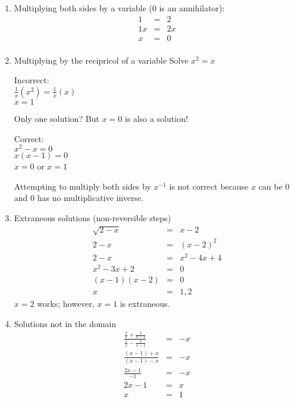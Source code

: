 \documentclass[letterpaper,12pt,fleqn]{article}
\begin{document}
\begin{enumerate}
\item Multiplying both sides by a variable (0 is an annihilator):
  \begin{eqnarray*}
    1 &=& 2 \\
    1x &=& 2x \\
    x &=& 0 \\
  \end{eqnarray*}
  
\item Multiplying by the recipricol of a variable
  Solve $x^2=x$

  Incorrect:\\
  $\frac{1}{x}(x^2)=\frac{1}{x}(x)$ \\
  $x=1$

  Only one solution? But $x=0$ is also a solution!

  Correct: \\
  $x^2-x=0$ \\
  $x(x-1)=0$ \\
  $x=0$ or $x=1$

  Attempting to multiply both sides by $x^{-1}$ is not correct because $x$
  can be $0$ and $0$ has no multiplicative inverse.

\item Extraneous solutions (non-reversible steps)
  \begin{eqnarray*}
    \sqrt{2-x} &=& x-2 \\
    2-x &=& (x-2)^2 \\
    2-x &=& x^2-4x+4 \\
    x^2-3x+2 &=& 0 \\
    (x-1)(x-2) &=& 0 \\
    x &=& 1,2
  \end{eqnarray*}
  $x=2$ works; however, $x=1$ is extraneous.

\item Solutions not in the domain
  \begin{eqnarray*}
    \frac{\frac{1}{x}+\frac{1}{x-1}}{\frac{1}{x}-\frac{1}{x-1}} &=& -x \\
    \frac{(x-1)+x}{(x-1)-x} &=& -x \\
    \frac{2x-1}{-1} &=& -x \\
    2x-1 &=& x \\
    x &=& 1 \\
  \end{eqnarray*}
\end{enumerate}
\end{document}
